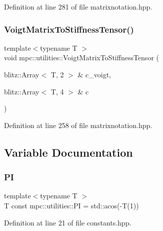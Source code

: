 Definition at line 281 of file matrixnotation.\+hpp.

\mbox{\label{namespacempc_1_1utilities_ad181e7080d74d1e523e872bc8ff53f5e}} 
\subsubsection{\texorpdfstring{Voigt\+Matrix\+To\+Stiffness\+Tensor()}{VoigtMatrixToStiffnessTensor()}}
{\footnotesize\ttfamily template$<$typename T $>$ \\
void mpc\+::utilities\+::\+Voigt\+Matrix\+To\+Stiffness\+Tensor (\begin{DoxyParamCaption}\item[{blitz\+::\+Array$<$ T, 2 $>$ \&}]{c\+\_\+voigt,  }\item[{blitz\+::\+Array$<$ T, 4 $>$ \&}]{c }\end{DoxyParamCaption})}



Definition at line 258 of file matrixnotation.\+hpp.



\subsection{Variable Documentation}
\mbox{\label{namespacempc_1_1utilities_a9ebe3319659192350da76891a61820d0}} 
\subsubsection{\texorpdfstring{PI}{PI}}
{\footnotesize\ttfamily template$<$typename T $>$ \\
T const mpc\+::utilities\+::\+PI = std\+::acos(-\/T(1))}



Definition at line 21 of file constants.\+hpp.

